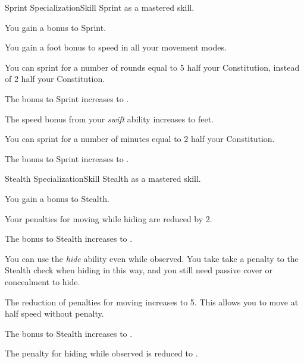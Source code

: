     \begin{feat}{Sprint Specialization}{Skill}
        \featpre Sprint as a mastered skill.
        \featben

         You gain a  bonus to Sprint.

         You gain a  foot bonus to speed in all your movement modes.

         You can sprint for a number of rounds equal to 5 \add half your Constitution, instead of 2 \add half your Constitution.

         The bonus to Sprint increases to .

         The speed bonus from your \textit{swift} ability increases to  feet.

         You can sprint for a number of minutes equal to 2 \add half your Constitution.

         The bonus to Sprint increases to .
    \end{feat}

    \begin{feat}{Stealth Specialization}{Skill}
        \featpre Stealth as a mastered skill.
        \featben

         You gain a  bonus to Stealth.

        \ff[2]{}

         Your penalties for moving while hiding are reduced by 2. 

         The bonus to Stealth increases to .

         You can use the \textit{hide} ability even while observed.
        You take take a  penalty to the Stealth check when hiding in this way, and you still need passive cover or concealment to hide.

         The reduction of penalties for moving increases to 5.
        This allows you to move at half speed without penalty.

         The bonus to Stealth increases to .

         The penalty for hiding while observed is reduced to .
    \end{feat}

